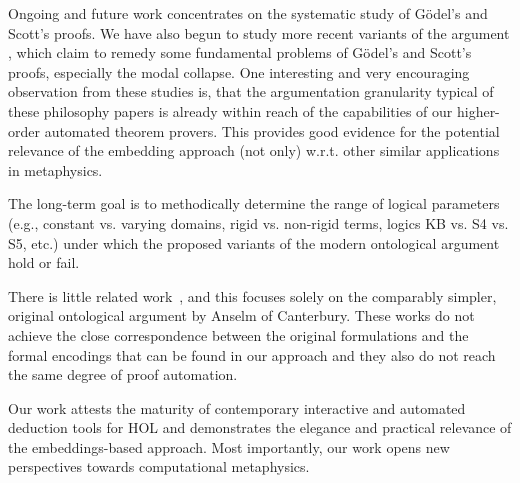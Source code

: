 \documentclass{llncs}
\begin{document}
Ongoing and future work concentrates on the systematic study of
G\"odel's and Scott's proofs. We have also begun to study more recent
variants of the argument
\cite{anderson90:_some_emend_of_goedel_ontol_proof,AndersonGettings,bjordal99,fuhrmann05:_exist_notwen,fitting02:_types_tableaus_god,Hajek2002,Hajek2008},
which claim to remedy some fundamental problems of G\"odel's and
Scott's proofs, especially the modal collapse.  One interesting
and very encouraging observation from these studies is, that the
argumentation granularity typical of these philosophy
papers is already within reach of the capabilities 
of our higher-order automated theorem provers.
This provides good evidence for the potential 
relevance of the embedding approach (not only) w.r.t. 
other similar applications in metaphysics.


The long-term goal
is to methodically determine the range of logical parameters (e.g.,
constant vs. varying domains, rigid vs. non-rigid terms, logics KB vs.
S4 vs. S5, etc.) under which the proposed variants of the modern
ontological argument hold or fail.

There is little related work~\cite{oppenheimera11,rushby13}, and this
focuses solely on the comparably simpler, original ontological
argument by Anselm of Canterbury.  These works do not achieve the
close correspondence between the original formulations and the formal
encodings that can be found in our approach and they also do not reach
the same degree of proof automation.

Our work attests the maturity of contemporary interactive and
automated deduction tools for HOL and
demonstrates the elegance and practical relevance of the
embeddings-based approach. Most importantly, our work opens new
perspectives towards computational metaphysics.






%
\end{document}
